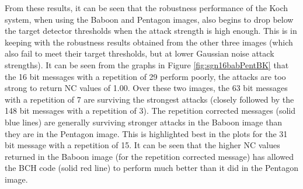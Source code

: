 \documentclass[12pt]{report}
\begin{document}
From these results, it can be seen that the robustness performance of the Koch system, when using the Baboon and Pentagon images,
also begins to drop below the target detector thresholds when the attack strength is high enough. This is in keeping with 
the robustness results obtained from the other three images (which also fail to meet their target thresholds, but at lower Gaussian noise
attack strengths).
It can be seen from the graphs in Figure \ref{fig:sgn16babPentBK} 
that the 16 bit messages with a repetition of 29 perform poorly, the attacks are too strong to return NC values of 1.00.
Over these two images, the 63 bit messages with a repetition of 7 are surviving the strongest attacks (closely 
followed by the 148 bit messages with a repetition of 3).
The repetition corrected messages (solid blue lines) are generally 
surviving stronger attacks in the Baboon image than they are in the Pentagon image.
This is highlighted best in the plots for the 31 bit message with a repetition of 15.
It can be seen that the higher NC values returned in the Baboon image (for the repetition 
corrected message) has allowed the BCH code (solid red line) to perform much better than it did in the Pentagon image.
\end{document}
